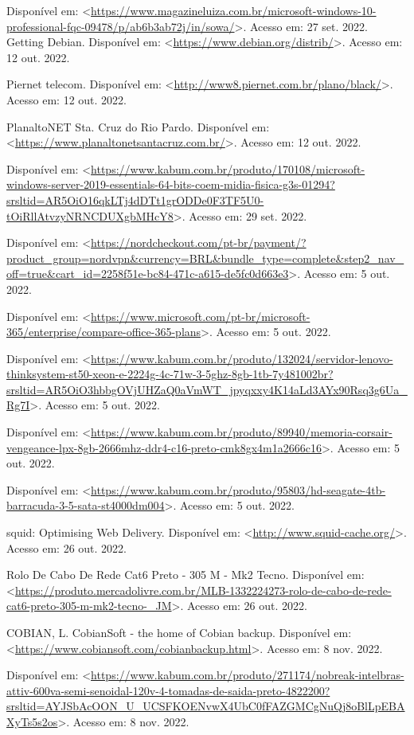 \documentclass[12pt]{article}
\begin{document}
Disponível em: <\url{https://www.magazineluiza.com.br/microsoft-windows-10-professional-fqc-09478/p/ab6b3ab72j/in/sowa/}>. Acesso em: 27 set. 2022.
Getting Debian. Disponível em: <\url{https://www.debian.org/distrib/}>. Acesso em: 12 out. 2022.

Piernet telecom. Disponível em: <\url{http://www8.piernet.com.br/plano/black/}>. Acesso em: 12 out. 2022.

PlanaltoNET Sta. Cruz do Rio Pardo. Disponível em: <\url{https://www.planaltonetsantacruz.com.br/}>. Acesso em: 12 out. 2022.

Disponível em:
<\url{https://www.kabum.com.br/produto/170108/microsoft-windows-server-2019-essentials-64-bits-coem-midia-fisica-g3s-01294?srsltid=AR5OiO16qkLTj4dDTt1grODDe0F3TF5U0-tOiRllAtvzyNRNCDUXgbMHcY8}>. Acesso em: 29 set. 2022.

Disponível em: <\url{https://nordcheckout.com/pt-br/payment/?product_group=nordvpn&currency=BRL&bundle_type=complete&step2_nav_off=true&cart_id=2258f51e-bc84-471c-a615-de5fc0d663e3}>. Acesso em: 5 out. 2022.

Disponível em: <\url{https://www.microsoft.com/pt-br/microsoft-365/enterprise/compare-office-365-plans}>. Acesso em: 5 out. 2022.

Disponível em: <\url{https://www.kabum.com.br/produto/132024/servidor-lenovo-thinksystem-st50-xeon-e-2224g-4c-71w-3-5ghz-8gb-1tb-7y481002br?srsltid=AR5OiO3hbbgOVjUHZaQ0aVmWT_jpyqxxy4K14aLd3AYx90Rsq3g6Ua_Rg7I}>. Acesso em: 5 out. 2022.

Disponível em: <\url{https://www.kabum.com.br/produto/89940/memoria-corsair-vengeance-lpx-8gb-2666mhz-ddr4-c16-preto-cmk8gx4m1a2666c16}>. Acesso em: 5 out. 2022.

Disponível em: <\url{https://www.kabum.com.br/produto/95803/hd-seagate-4tb-barracuda-3-5-sata-st4000dm004}>. Acesso em: 5 out. 2022.

squid: Optimising Web Delivery. Disponível em: <\url{http://www.squid-cache.org/}>. Acesso em: 26 out. 2022.

Rolo De Cabo De Rede Cat6 Preto - 305 M - Mk2 Tecno. Disponível em: <\url{https://produto.mercadolivre.com.br/MLB-1332224273-rolo-de-cabo-de-rede-cat6-preto-305-m-mk2-tecno-_JM}>. Acesso em: 26 out. 2022.

COBIAN, L. CobianSoft - the home of Cobian backup. Disponível em: <\url{https://www.cobiansoft.com/cobianbackup.html}>. Acesso em: 8 nov. 2022.

Disponível em: <\url{https://www.kabum.com.br/produto/271174/nobreak-intelbras-attiv-600va-semi-senoidal-120v-4-tomadas-de-saida-preto-4822200?srsltid=AYJSbAcOON_U_UCSFKOENvwX4UbC0fFAZGMCgNuQj8oBlLpEBAXyTs5s2os}>. Acesso em: 8 nov. 2022.
\end{document}
